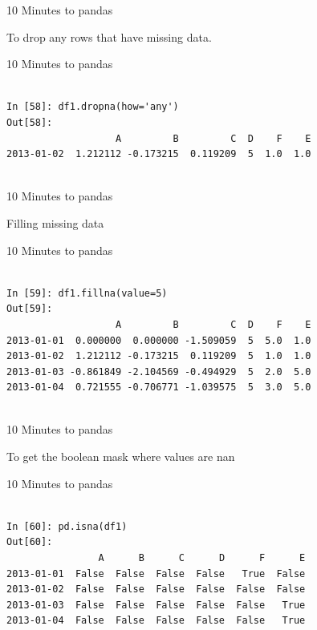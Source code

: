 \documentclass{beamer}
\begin{document}
\begin{frame}[t]{10 Minutes to pandas}

To drop any rows that have missing data.

\end{frame}


\begin{frame}[t,fragile]{10 Minutes to pandas}


	\scriptsize
\begin{verbatim}

In [58]: df1.dropna(how='any')
Out[58]: 
                   A         B         C  D    F    E
2013-01-02  1.212112 -0.173215  0.119209  5  1.0  1.0


\end{verbatim}


\end{frame}


\begin{frame}[t]{10 Minutes to pandas}

Filling missing data

\end{frame}


\begin{frame}[t,fragile]{10 Minutes to pandas}


	\scriptsize
\begin{verbatim}

In [59]: df1.fillna(value=5)
Out[59]: 
                   A         B         C  D    F    E
2013-01-01  0.000000  0.000000 -1.509059  5  5.0  1.0
2013-01-02  1.212112 -0.173215  0.119209  5  1.0  1.0
2013-01-03 -0.861849 -2.104569 -0.494929  5  2.0  5.0
2013-01-04  0.721555 -0.706771 -1.039575  5  3.0  5.0


\end{verbatim}


\end{frame}


\begin{frame}[t]{10 Minutes to pandas}

To get the boolean mask where values are nan

\end{frame}


\begin{frame}[t,fragile]{10 Minutes to pandas}


	\scriptsize
\begin{verbatim}

In [60]: pd.isna(df1)
Out[60]: 
                A      B      C      D      F      E
2013-01-01  False  False  False  False   True  False
2013-01-02  False  False  False  False  False  False
2013-01-03  False  False  False  False  False   True
2013-01-04  False  False  False  False  False   True


\end{verbatim}


\end{frame}
\end{document}
